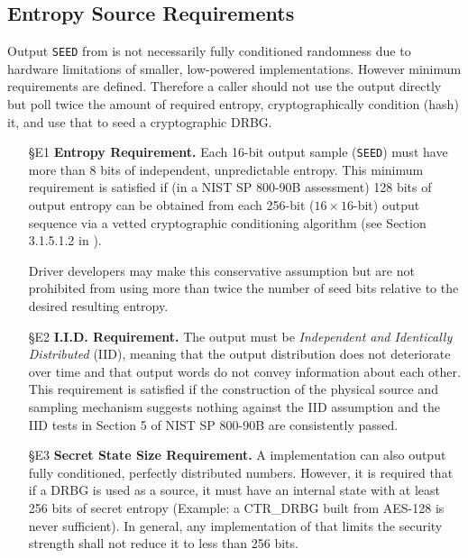 {\subsection{Entropy Source Requirements}
\label{sec:req-es}
\label{sec:req-entropy}
\label{sec:req-iid}
\label{sec:req-state}

    Output \verb|SEED| from  is not necessarily fully
    conditioned randomness due to hardware limitations of smaller,
    low-powered implementations. However minimum requirements are
    defined. Therefore a caller should not use the output directly but poll
    twice the amount of required entropy, cryptographically condition
    (hash) it, and use that to seed a cryptographic DRBG.

    \begin{itemize}

    \item[\S E1]    {\bf Entropy Requirement.}
    Each 16-bit output sample (\verb|SEED|) must have more than 8 bits of
    independent, unpredictable entropy. This minimum requirement is
    satisfied if (in a NIST SP 800-90B \cite{TuBaKe+18} assessment) 128
    bits of output entropy can be obtained from each 256-bit
    ($16 \times 16$-bit)  output sequence via a vetted
    cryptographic conditioning algorithm (see Section 3.1.5.1.2 in
    \cite{TuBaKe+18}).

    Driver developers may make this conservative assumption but are not
    prohibited from using more than twice the number of seed bits relative
    to the desired resulting entropy.

    \item[\S E2]    {\bf I.I.D. Requirement.}
    The output must be \emph{Independent and Identically Distributed}
    (IID), meaning that the output distribution does not deteriorate over
    time and that output words do not convey information about each other.
    This requirement is satisfied if the construction of the physical source
    and sampling mechanism suggests nothing against the IID assumption
    and the IID tests in Section 5 of NIST SP 800-90B \cite{TuBaKe+18} are
    consistently passed.

    \item[\S E3]    {\bf Secret State Size Requirement.}
    A  implementation can also output fully conditioned,
    perfectly distributed numbers. However, it is required that if a DRBG is
    used as a source, it must have an internal state with at least 256 bits
    of secret entropy (Example: a CTR\_DRBG built from AES-128 is never
    sufficient). In general, any implementation of  that
    limits the security strength shall not reduce it to less than 256 bits.


\end{itemize}}
